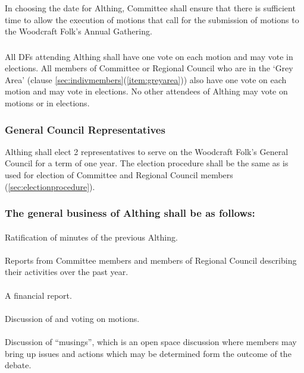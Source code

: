 \documentclass[a4paper, 12pt]{report}
\begin{document}
\subsubsection{}
In choosing the date for Althing, Committee shall ensure that there is sufficient time to allow the execution of motions that call for the submission of motions to the Woodcraft Folk's Annual Gathering.
\subsubsection{}
All DFs attending Althing shall have one vote on each motion and may vote in elections. All members of Committee or Regional Council who are in the `Grey Area' (clause \ref{sec:indivmembers}(\ref{item:greyarea})) also have one vote on each motion and may vote in elections. No other attendees of Althing may vote on motions or in elections.
\subsubsection{General Council Representatives}
Althing shall elect 2 representatives to serve on the Woodcraft Folk's General Council for a term of one year. The election procedure shall be the same as is used for election of Committee and Regional Council members (\ref{sec:electionprocedure}).
\subsubsection{The general business of Althing shall be as follows:}
\paragraph{}
Ratification of minutes of the previous Althing.
\paragraph{}
Reports from Committee members and members of Regional Council describing their activities over the past year.
\paragraph{}
A financial report.
\paragraph{}
Discussion of and voting on motions.
\paragraph{}
Discussion of ``musings'', which is an open space discussion where members may bring up issues and actions which may be determined form the outcome of the debate.
\end{document}
